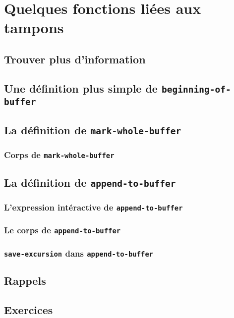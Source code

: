 \chapter{Quelques fonctions liées aux tampons}

\section{Trouver plus d'information}

\section{Une définition plus simple de
  \texttt{beginning-of-buffer}} 

\section{La définition de \texttt{mark-whole-buffer}}

\subsection{Corps de \texttt{mark-whole-buffer}}

\section{La définition de \texttt{append-to-buffer}}

\subsection{L'expression intéractive de
  \texttt{append-to-buffer}} 

\subsection{Le corps de \texttt{append-to-buffer}}

\subsection{\texttt{save-excursion} dans
  \texttt{append-to-buffer}} 

\section{Rappels}

\section{Exercices}


